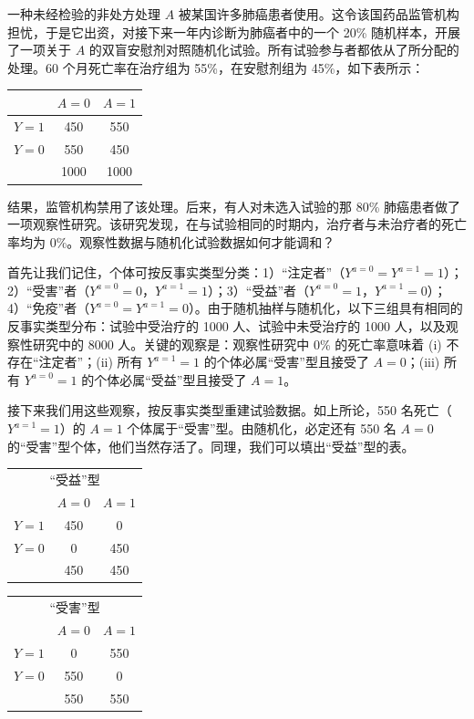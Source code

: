 \begin{finepoint}[随机化试验与观察性研究的一个反直觉比较]
一种未经检验的非处方处理 $A$ 被某国许多肺癌患者使用。这令该国药品监管机构担忧，于是它出资，对接下来一年内诊断为肺癌者中的一个 20\% 随机样本，开展了一项关于 $A$ 的双盲安慰剂对照随机化试验。所有试验参与者都依从了所分配的处理。60 个月死亡率在治疗组为 55\%，在安慰剂组为 45\%，如下表所示：

\begin{center}
\begin{tabular}{lcc}
\toprule
& $A=0$ & $A=1$\\
\midrule
$Y=1$ & 450 & 550\\
$Y=0$ & 550 & 450\\
\midrule
& 1000 & 1000\\
\bottomrule
\end{tabular}
\end{center}

结果，监管机构禁用了该处理。后来，有人对未选入试验的那 80\% 肺癌患者做了一项观察性研究。该研究发现，在与试验相同的时期内，治疗者与未治疗者的死亡率均为 0\%。观察性数据与随机化试验数据如何才能调和？

首先让我们记住，个体可按反事实类型分类：1）“注定者”（$Y^{a=0}=Y^{a=1}=1$）；2）“受害”者（$Y^{a=0}=0$，$Y^{a=1}=1$）；3）“受益”者（$Y^{a=0}=1$，$Y^{a=1}=0$）；4）“免疫”者（$Y^{a=0}=Y^{a=1}=0$）。由于随机抽样与随机化，以下三组具有相同的反事实类型分布：试验中受治疗的 1000 人、试验中未受治疗的 1000 人，以及观察性研究中的 8000 人。关键的观察是：观察性研究中 0\% 的死亡率意味着 (i) 不存在“注定者”；(ii) 所有 $Y^{a=1}=1$ 的个体必属“受害”型且接受了 $A=0$；(iii) 所有 $Y^{a=0}=1$ 的个体必属“受益”型且接受了 $A=1$。

接下来我们用这些观察，按反事实类型重建试验数据。如上所论，550 名死亡（$Y^{a=1}=1$）的 $A=1$ 个体属于“受害”型。由随机化，必定还有 550 名 $A=0$ 的“受害”型个体，他们当然存活了。同理，我们可以填出“受益”型的表。

\begin{center}
\begin{tabular}[t]{lcc}
\toprule
\multicolumn{3}{c}{“受益”型}\\
& $A=0$ & $A=1$\\
\midrule
$Y=1$ & 450 & 0\\
$Y=0$ & 0 & 450\\
\midrule
& 450 & 450\\
\bottomrule
\end{tabular}
\hspace{3em}
\begin{tabular}[t]{lcc}
\toprule
\multicolumn{3}{c}{“受害”型}\\
& $A=0$ & $A=1$\\
\midrule
$Y=1$ & 0 & 550\\
$Y=0$ & 550 & 0\\
\midrule
& 550 & 550\\
\bottomrule
\end{tabular}
\end{center}


\end{finepoint}
